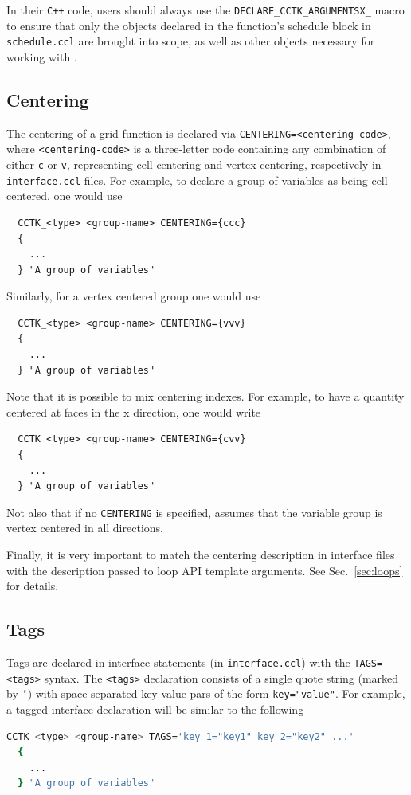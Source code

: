 In their \texttt{C++} code, users should always use the \texttt{DECLARE\_CCTK\_ARGUMENTSX\_<scheduled function name>} macro to ensure that only the objects declared in the function's schedule block in \texttt{schedule.ccl} are brought into scope, as well as other objects necessary for working with \CarpetX.

 \subsection{Centering}

The centering of a grid function is declared via \texttt{CENTERING={<centering-code>}}, where \texttt{<centering-code>} is a three-letter code containing any combination of either \texttt{c} or \texttt{v}, representing cell centering and vertex centering, respectively in \texttt{interface.ccl} files. For example, to declare a group of variables as being cell centered, one would use
%
\begin{lstlisting}
  CCTK_<type> <group-name> CENTERING={ccc}
  {
    ...
  } "A group of variables"
\end{lstlisting}

Similarly, for a vertex centered group one would use
%
\begin{lstlisting}
  CCTK_<type> <group-name> CENTERING={vvv}
  {
    ...
  } "A group of variables"
\end{lstlisting}

Note that it is possible to mix centering indexes. For example, to have a quantity centered at faces in the x direction, one would write
%
\begin{lstlisting}
  CCTK_<type> <group-name> CENTERING={cvv}
  {
    ...
  } "A group of variables"
\end{lstlisting}

Not also that if no \texttt{CENTERING} is specified, \CarpetX\space assumes that the variable group is vertex centered in all directions.

Finally, it is very important to match the centering description in interface files with the description passed to loop API template arguments. See Sec.~\ref{sec:loops} for details.

\subsection{Tags}
\label{sec:tags}

Tags are declared in interface statements (in \texttt{interface.ccl}) with the \texttt{TAGS=<tags>} syntax. The \texttt{<tags>} declaration consists of a single quote string (marked by \texttt{'}) with space separated key-value pars of the form \texttt{key="value"}. For example, a tagged interface declaration will be similar to the following
%
\begin{lstlisting}[language=bash]
  CCTK_<type> <group-name> TAGS='key_1="key1" key_2="key2" ...'
  {
    ...
  } "A group of variables"
\end{lstlisting}

